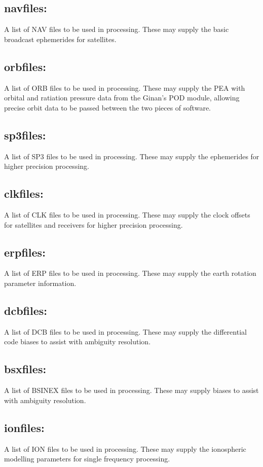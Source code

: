 \subsection*{navfiles:}
A list of NAV files to be used in processing. These may supply the basic broadcast ephemerides for satellites.

\subsection*{orbfiles:}
A list of ORB files to be used in processing. These may supply the PEA with orbital and ratiation pressure data from the Ginan's POD module, allowing precise orbit data to be passed between the two pieces of software.

\subsection*{sp3files:}
A list of SP3 files to be used in processing. These may supply the ephemerides for higher precision processing.

\subsection*{clkfiles:}
A list of CLK files to be used in processing. These may supply the clock offsets for satellites and receivers for higher precision processing.

\subsection*{erpfiles:}
A list of ERP files to be used in processing. These may supply the earth rotation parameter information.

\subsection*{dcbfiles:}
A list of DCB files to be used in processing. These may supply the differential code biases to assist with ambiguity resolution.

\subsection*{bsxfiles:}
A list of BSINEX files to be used in processing. These may supply biases to assist with ambiguity resolution.

\subsection*{ionfiles:}
A list of ION files to be used in processing. These may supply the ionospheric modelling parameters for single frequency processing.






